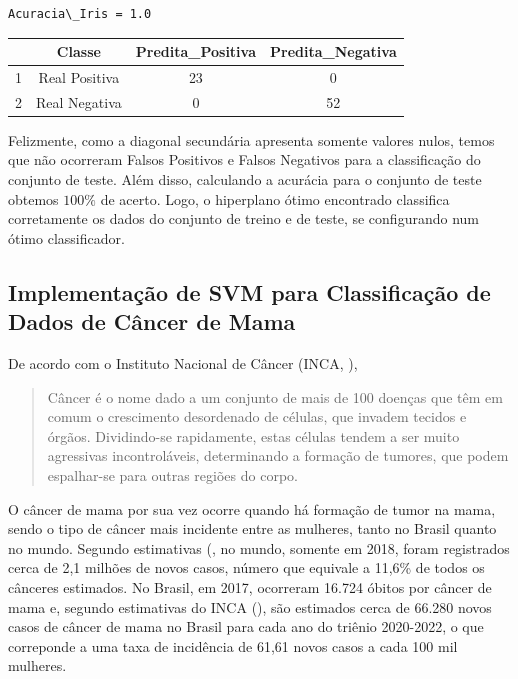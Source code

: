 \documentclass[12pt,a4paper]{scrartcl}
\theoremstyle{definition}%
\newcommand{\prompt}[4]{
        \ttfamily\llap{{\color{#2}[#3]:\hspace{3pt}#4}}\vspace{-\baselineskip}
    }
\begin{document}
    \begin{Verbatim}[commandchars=\\\{\}]
Acuracia\_Iris = 1.0
    \end{Verbatim}
 
{            
\prompt{Out}{outcolor}{25}{}
    
    \begin{tabular}{r|ccc}
    & Classe & Predita\_Positiva & Predita\_Negativa\\
    \hline
    
    1 & Real Positiva & 23 & 0 \\
    2 & Real Negativa & 0 & 52 \\
\end{tabular}
\vspace{0.5cm}
}

Felizmente, como a diagonal secundária apresenta somente valores nulos,
temos que não ocorreram Falsos Positivos e Falsos Negativos para a
classificação do conjunto de teste. Além disso, calculando a acurácia
para o conjunto de teste obtemos $100\%$ de acerto. Logo, o hiperplano
ótimo encontrado classifica corretamente os dados do conjunto de treino
e de teste, se configurando num ótimo classificador.

    \hypertarget{implementauxe7uxe3o-de-svm-para-classificauxe7uxe3o-de-dados-de-cuxe2ncer-de-mama}{%
\subsection{Implementação de SVM para Classificação de Dados de Câncer
de
Mama}\label{implementauxe7uxe3o-de-svm-para-classificauxe7uxe3o-de-dados-de-cuxe2ncer-de-mama}}

De acordo com o Instituto Nacional de Câncer (INCA, \cite{Inca}), 
\begin{quote}
{\raggedleft Câncer é o nome dado a um conjunto de mais de 100 doenças que têm em comum o crescimento desordenado de células, que invadem tecidos e órgãos.
Dividindo-se rapidamente, estas células tendem a ser muito agressivas incontroláveis, determinando a formação de tumores, que podem espalhar-se para outras regiões do corpo.}
\end{quote}

O câncer de mama por sua
vez ocorre quando há formação de tumor na mama, sendo o tipo de câncer
mais incidente entre as mulheres, tanto no Brasil quanto no mundo. Segundo estimativas (\cite{Inca,Femama,SocBraMastologia}, no
mundo, somente em 2018, foram registrados cerca de 2,1 milhões de novos
casos, número que equivale a 11,6\% de todos os cânceres estimados. No
Brasil, em 2017, ocorreram 16.724 óbitos por câncer de mama e, segundo
estimativas do INCA (\cite{Inca}), são estimados cerca de 66.280 novos casos de câncer
de mama no Brasil para cada ano do triênio 2020-2022, o que correponde a
uma taxa de incidência de 61,61 novos casos a cada 100 mil mulheres.
\end{document}
